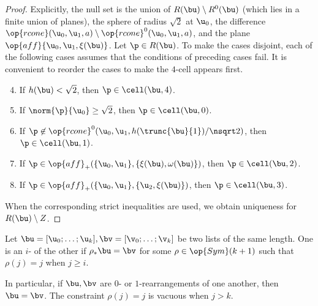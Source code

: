 \begin{proof} 
  Explicitly, the null set is the union of $R(\bu)\setminus R^0(\bu)$
  (which lies in a finite union of planes), the sphere of radius
  $\sqrt2$ at $\u_0$, the difference $\op{rcone}(\u_0,\u_1,a)\setminus
  \op{rcone}^0(\u_0,\u_1,a)$, and the plane
  $\op{aff}\{\u_0,\u_1,\xi(\bu)\}$.  Let $\p\in R(\bu)$.  To make the
  cases disjoint, each of the following cases assumes that the
  conditions of preceding cases fail.  It is convenient to reorder the
  cases to make the $4$-cell appears first.
\begin{enumerate}
\setcounter{enumi}{3}
\item %
If $h(\bu)<\sqrt2$,  then $\p\in\cell(\bu,4)$.

\setcounter{enumi}{-1}
\item %
If $\norm{\p}{\u_0} \ge\sqrt2$,  then $\p\in\cell(\bu,0)$.

\item
If $\p\not\in\op{rcone}^0(\u_0,\u_1,h(\trunc{\bu}{1})/\nsqrt2)$, then
 $\p\in \cell(\bu,1)$.

\item
If $\p\in \op{aff}_+(\{\u_0,\u_1\},\{\xi(\bu),\omega(\bu)\})$, then
 $\p\in \cell(\bu,2)$.

\item If $\p\in \op{aff}_+(\{\u_0,\u_1\},\{\u_2,\xi(\bu)\})$, then
  $\p\in \cell(\bu,3)$.
\end{enumerate}
When the corresponding strict inequalities are used, we obtain
uniqueness for $R(\bu)\setminus Z$.
\end{proof}



\begin{definition}[$i$-rearrangement] 
   Let
  $\bu=[\u_0;\ldots;\u_k],\bv=[\v_0;\ldots;\v_k]$ be two lists of the
  same length.  One is an $i$- of the other if
  $\rho_*\bu = \bv$ for some $\rho\in\op{Sym}(k+1)$ such that $\rho(j) =
  j$ when $j \ge i$.
\end{definition}

In particular, if $\bu,\bv$ are $0$- or $1$-rearrangements of one
another, then $\bu = \bv$.  The constraint $\rho(j)=j$ is vacuous when
$j>k$.



